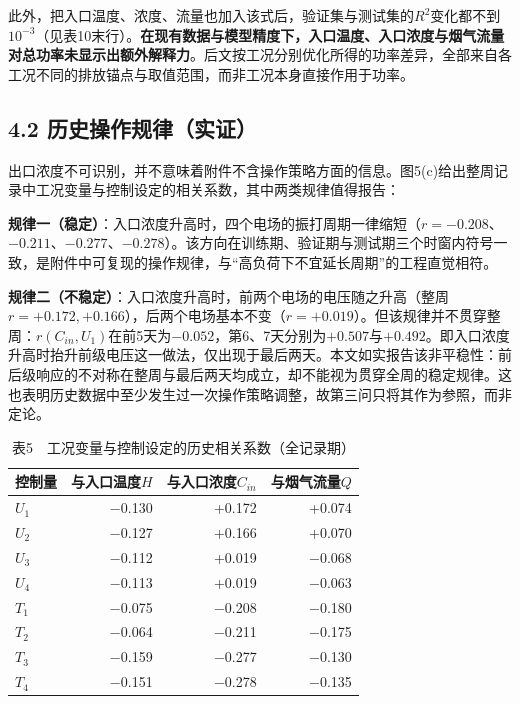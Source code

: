 \documentclass[UTF8,zihao=5,a4paper]{ctexart}
\begin{document}
此外，把入口温度、浓度、流量也加入该式后，验证集与测试集的$R^2$变化都不到$10^{-3}$（见表10末行）。\textbf{在现有数据与模型精度下，入口温度、入口浓度与烟气流量对总功率未显示出额外解释力}。后文按工况分别优化所得的功率差异，全部来自各工况不同的排放锚点与取值范围，而非工况本身直接作用于功率。

\subsection*{4.2 历史操作规律（实证）}

出口浓度不可识别，并不意味着附件不含操作策略方面的信息。图5(c)给出整周记录中工况变量与控制设定的相关系数，其中两类规律值得报告：

\textbf{规律一（稳定）}：入口浓度升高时，四个电场的振打周期一律缩短（$r=-0.208$、$-0.211$、$-0.277$、$-0.278$）。该方向在训练期、验证期与测试期三个时窗内符号一致，是附件中可复现的操作规律，与“高负荷下不宜延长周期”的工程直觉相符。

\textbf{规律二（不稳定）}：入口浓度升高时，前两个电场的电压随之升高（整周$r=+0.172,+0.166$），后两个电场基本不变（$r=+0.019$）。但该规律并不贯穿整周：$r(C_{in},U_1)$在前5天为$-0.052$，第6、7天分别为$+0.507$与$+0.492$。即入口浓度升高时抬升前级电压这一做法，仅出现于最后两天。本文如实报告该非平稳性：前后级响应的不对称在整周与最后两天均成立，却不能视为贯穿全周的稳定规律。这也表明历史数据中至少发生过一次操作策略调整，故第三问只将其作为参照，而非定论。


\begin{table}[htbp]
\centering
\caption*{\normalsize 表5　工况变量与控制设定的历史相关系数（全记录期）}
\vspace{-2pt}
\begin{tabular}{lrrr}
\toprule
控制量 & 与入口温度$H$ & 与入口浓度$C_{in}$ & 与烟气流量$Q$ \\
\midrule
$U_1$ & −0.130 & +0.172 & +0.074 \\
$U_2$ & −0.127 & +0.166 & +0.070 \\
$U_3$ & −0.112 & +0.019 & −0.068 \\
$U_4$ & −0.113 & +0.019 & −0.063 \\
$T_1$ & −0.075 & −0.208 & −0.180 \\
$T_2$ & −0.064 & −0.211 & −0.175 \\
$T_3$ & −0.159 & −0.277 & −0.130 \\
$T_4$ & −0.151 & −0.278 & −0.135 \\
\bottomrule
\end{tabular}
\end{table}
\end{document}
